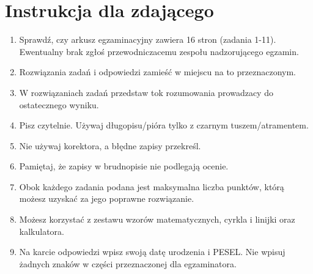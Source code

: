 \documentclass[10pt]{article}
\begin{document}
\section*{Instrukcja dla zdającego}
\begin{enumerate}
  \item Sprawdź, czy arkusz egzaminacyjny zawiera 16 stron (zadania 1-11). Ewentualny brak zgłoś przewodniczacemu zespołu nadzorującego egzamin.
  \item Rozwiązania zadań i odpowiedzi zamieść w miejscu na to przeznaczonym.
  \item W rozwiązaniach zadań przedstaw tok rozumowania prowadzacy do ostatecznego wyniku.
  \item Pisz czytelnie. Używaj długopisu/pióra tylko z czarnym tuszem/atramentem.
  \item Nie używaj korektora, a błędne zapisy przekreśl.
  \item Pamiętaj, że zapisy w brudnopisie nie podlegają ocenie.
  \item Obok każdego zadania podana jest maksymalna liczba punktów, którą możesz uzyskać za jego poprawne rozwiązanie.
  \item Możesz korzystać z zestawu wzorów matematycznych, cyrkla i linijki oraz kalkulatora.
  \item Na karcie odpowiedzi wpisz swoją datę urodzenia i PESEL. Nie wpisuj żadnych znaków w części przeznaczonej dla egzaminatora.\\

\end{enumerate}
\end{document}

